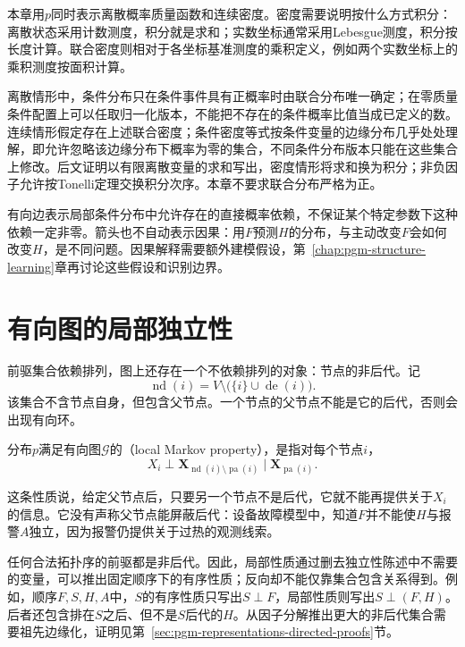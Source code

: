 本章用$p$同时表示离散概率质量函数和连续密度。密度需要说明按什么方式积分：离散状态采用计数测度，积分就是求和；实数坐标通常采用Lebesgue测度，积分按长度计算。联合密度则相对于各坐标基准测度的乘积定义，例如两个实数坐标上的乘积测度按面积计算。

离散情形中，条件分布只在条件事件具有正概率时由联合分布唯一确定；在零质量条件配置上可以任取归一化版本，不能把不存在的条件概率比值当成已定义的数。连续情形假定存在上述联合密度；条件密度等式按条件变量的边缘分布几乎处处理解，即允许忽略该边缘分布下概率为零的集合，不同条件分布版本只能在这些集合上修改。后文证明以有限离散变量的求和写出，密度情形将求和换为积分；非负因子允许按Tonelli定理交换积分次序。本章不要求联合分布严格为正。

有向边表示局部条件分布中允许存在的直接概率依赖，不保证某个特定参数下这种依赖一定非零。箭头也不自动表示因果：用$F$预测$H$的分布，与主动改变$F$会如何改变$H$，是不同问题。因果解释需要额外建模假设，第~\ref{chap:pgm-structure-learning}章再讨论这些假设和识别边界。

\section{有向图的局部独立性}
\label{sec:pgm-directed-local}

前驱集合依赖排列，图上还存在一个不依赖排列的对象：节点的非后代。记
\[
  \operatorname{nd}(i)=V\setminus\bigl(\{i\}\cup\operatorname{de}(i)\bigr).
\]
该集合不含节点自身，但包含父节点。一个节点的父节点不能是它的后代，否则会出现有向环。

\begin{definition}[局部Markov性质]
  \label{def:pgm-directed-local-markov}
  分布$p$满足有向图$\mathcal{G}$的（local Markov property），是指对每个节点$i$，
  \begin{equation}
    X_i\perp
    \bm{X}_{\operatorname{nd}(i)\setminus\operatorname{pa}(i)}
    \mid\bm{X}_{\operatorname{pa}(i)}.
    \label{eq:pgm-directed-local-markov}
  \end{equation}
\end{definition}

这条性质说，给定父节点后，只要另一个节点不是后代，它就不能再提供关于$X_i$的信息。它没有声称父节点能屏蔽后代：设备故障模型中，知道$F$并不能使$H$与报警$A$独立，因为报警仍提供关于过热的观测线索。

任何合法拓扑序的前驱都是非后代。因此，局部性质通过删去独立性陈述中不需要的变量，可以推出固定顺序下的有序性质；反向却不能仅靠集合包含关系得到。例如，顺序$F,S,H,A$中，$S$的有序性质只写出$S\perp F$，局部性质则写出$S\perp(F,H)$。后者还包含排在$S$之后、但不是$S$后代的$H$。从因子分解推出更大的非后代集合需要祖先边缘化，证明见第~\ref{sec:pgm-representations-directed-proofs}节。

